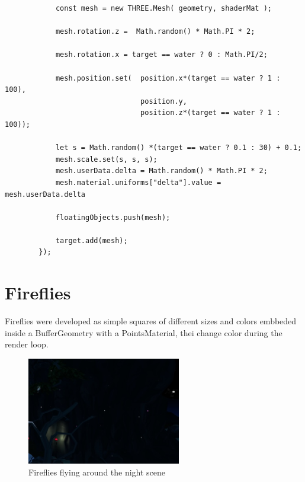 \documentclass[10pt,a4paper]{article}
\begin{document}
\begin{verbatim}
            const mesh = new THREE.Mesh( geometry, shaderMat );

            mesh.rotation.z =  Math.random() * Math.PI * 2; 

            mesh.rotation.x = target == water ? 0 : Math.PI/2;
            
            mesh.position.set(  position.x*(target == water ? 1 : 100),
                                position.y,
                                position.z*(target == water ? 1 : 100));
            
            let s = Math.random() *(target == water ? 0.1 : 30) + 0.1;
            mesh.scale.set(s, s, s);
            mesh.userData.delta = Math.random() * Math.PI * 2;
            mesh.material.uniforms["delta"].value = mesh.userData.delta

            floatingObjects.push(mesh);
        
            target.add(mesh);
        });
\end{verbatim}

\section{Fireflies}

Fireflies were developed as simple squares of different sizes and colors embbeded inside a BufferGeometry with a PointsMaterial, thei change color during the render loop.

\begin{figure}[H]
 \centering
  \includegraphics[width=0.6\textwidth]{fireflies}
     \caption{Fireflies flying around the night scene}
\end{figure}
\end{document}
